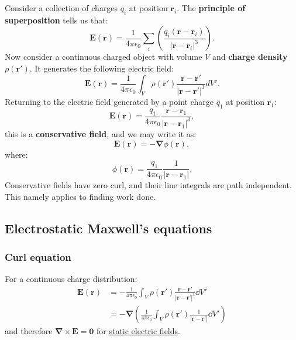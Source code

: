 \documentclass{article}
\begin{document}
Consider a collection of charges $q_i$ at position $\boldsymbol{r}_i$. The \textbf{principle of superposition} tells us that:
$$\boldsymbol{E}(\boldsymbol{r})=\frac{1}{4\pi\epsilon_0}
\sum_i \left(\frac{q_i (\boldsymbol{r}-\boldsymbol{r}_i)}
{|\boldsymbol{r}-\boldsymbol{r}_i|^3}\right).$$
Now consider a continuous charged object with volume $V$
and \textbf{charge density} $\rho(\boldsymbol{r}')$.
It generates the following electric field:
$$\boldsymbol{E}(\boldsymbol{r})=\frac{1}{4\pi\epsilon_0}
\int_V \rho(\boldsymbol{r}')\frac{\boldsymbol{r}-\boldsymbol{r}'}
{|\boldsymbol{r}-\boldsymbol{r}'|^3}dV'.$$
Returning to the electric field generated by a point charge $q_1$
at position $\boldsymbol{r}_1$:
$$\boldsymbol{E}(\boldsymbol{r})=\frac{q_1}{4\pi\epsilon_0}
\frac{\boldsymbol{r}-\boldsymbol{r}_1}{|\boldsymbol{r}-\boldsymbol{r}_1|^3},$$
this is a \textbf{conservative field}, and we may write it as:
$$\boldsymbol{E}(\boldsymbol{r})=-\boldsymbol{\nabla}\phi(\boldsymbol{r}),$$
where:
$$\phi(\boldsymbol{r})=\frac{q_1}{4\pi\epsilon_0}\frac{1}{|\boldsymbol{r}-\boldsymbol{r}_1|}.$$
Conservative fields have zero curl, and their line integrals are path independent. This namely applies to finding work done.

\newpage

\subsection{Electrostatic Maxwell's equations}

\subsubsection{Curl equation}
For a continuous charge distribution:
\begin{align*}
    \boldsymbol{E}(\boldsymbol{r})
    &=-\frac{1}{4\pi\epsilon_0}
    \int_V\rho(\boldsymbol{r}')
    \frac{\boldsymbol{r}-\boldsymbol{r}'}{|\boldsymbol{r}-\boldsymbol{r}'|^3}
    \dd V' \\
    &=-\boldsymbol{\nabla}
    \left(\frac{1}{4\pi\epsilon_0}
    \int_V\rho(\boldsymbol{r}')
    \frac{1}{|\boldsymbol{r}-\boldsymbol{r}'|}
    \dd V'\right)
\end{align*}
and therefore $\boldsymbol{\nabla}\times
\boldsymbol{E}=\boldsymbol{0}$ for \underline{static electric fields}.
\end{document}
